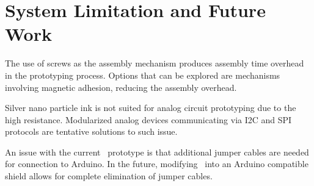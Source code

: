 \section{System Limitation and Future Work}




The use of screws as the assembly mechanism produces assembly time overhead in the prototyping process. Options that can be explored are mechanisms involving magnetic adhesion, reducing the assembly overhead.

Silver nano particle ink is not suited for analog circuit prototyping due to the high resistance. Modularized analog devices communicating via I2C and SPI protocols are tentative solutions to such issue.

An issue with the current \papertitle\ prototype is that additional jumper cables are needed for connection to Arduino. In the future, modifying \papertitle\ into an Arduino compatible shield allows for complete elimination of jumper cables.

